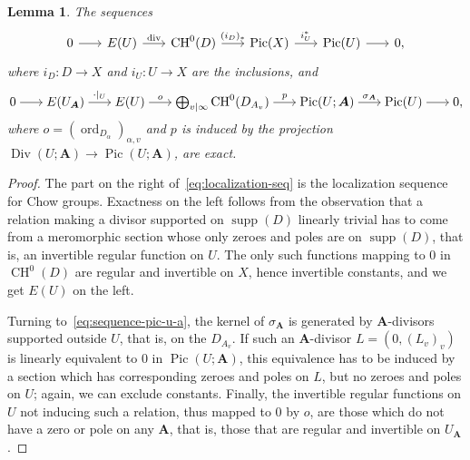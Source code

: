 \documentclass[a4paper, twoside, 10pt]{amsart}
\newcommand{\uA}{{\boldsymbol{A}}}
\DeclareMathOperator{\CH}{CH}
\DeclareMathOperator{\Div}{Div}
\DeclareMathOperator{\sdiv}{div}
\DeclareMathOperator{\ord}{ord}
\DeclareMathOperator{\Pic}{Pic}
\DeclareMathOperator{\supp}{supp}
\newtheorem{lemma}[theorem]{Lemma}
\theoremstyle{definition}
\begin{document}
\begin{lemma}\label{lem:sequences}
  The sequences
  \begin{equation}\label{eq:localization-seq}
    \begin{tikzcd}[column sep=scriptsize]
      0  \arrow[r]
      &  E(U) \arrow[r, "\sdiv"]
      &  \CH^0(D) \arrow[r, "(i_D)_*"]
      &  \Pic(X) \arrow[r, "i_U^*"]
      &  \Pic(U) \arrow[r]
      &  0,
    \end{tikzcd}
  \end{equation}
  where $i_D\colon D\to X$ and $i_U\colon U\to X$ are the inclusions,
  and
  \begin{equation}\label{eq:sequence-pic-u-a}
    \begin{tikzcd}[cramped, column sep=scriptsize]
      0 \arrow[r]
      & E(U_\uA) \arrow[r, "\cdot|_U"]
      & E(U) \arrow[r, "o"]
      & \bigoplus_{v\mid\infty} \CH^0(D_{A_v}) \arrow[r, "p"]
      & \Pic(U;\uA) \arrow[r, "\sigma_{\uA}"]
      & \Pic(U) \arrow[r]
      & 0,
    \end{tikzcd}
  \end{equation}
  where $o=(\ord_{D_\alpha})_{\alpha,v}$ and $p$ is induced by the projection $\Div(U;\uA) \to \Pic(U;\uA)$,
  are exact.
\end{lemma}
\begin{proof}
  The part on the right of~\eqref{eq:localization-seq} is the localization sequence for Chow groups. Exactness on the left follows from the observation that a relation making a divisor supported on $\supp(D)$ linearly trivial has to come from a meromorphic section whose only zeroes and poles are on $\supp(D)$, that is, an invertible regular function on $U$. The only such functions mapping to $0$ in $\CH^0(D)$ are regular and invertible on $X$, hence invertible constants, and we get $E(U)$ on the left.

  Turning to~\eqref{eq:sequence-pic-u-a}, the kernel of $\sigma_\uA$ is generated by $\uA$-divisors supported outside $U$, that is, on the $D_{A_v}$.
  If such an $\uA$-divisor $L=(0,(L_v)_v)$ is linearly equivalent to $0$ in $\Pic(U;\uA)$, this equivalence has to be induced by a section which has corresponding zeroes and poles on $L$, but no zeroes and poles on $U$; again, we can exclude constants. Finally, the invertible regular functions on $U$ not inducing such a relation, thus mapped to $0$ by $o$, are those which do not have a zero or pole on any $\uA$, that is, those that are regular and invertible on $U_\uA$.
\end{proof}
\end{document}
